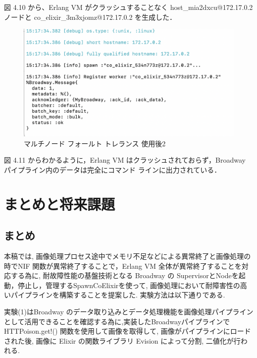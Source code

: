 \documentclass[a4paper]{jreport}	%
\begin{document}
図 4.10 から、Erlang VM がクラッシュすることなく host\_mia2dxcu@172.17.0.2 ノードと co\_elixir\_3m3xjomz@172.17.0.2 を生成した．

\begin{figure}[H]
\vspace{4cm}
\begin{center}
\hspace{-8cm}
\includegraphics[scale=0.5]{ja/f13.png}
\end{center}
\caption{マルチノード フォールト トレランス 使用後2}
\end{figure}

図 4.11 からわかるように，Erlang VM はクラッシュされておらず，Broadway パイプライン内のデータは完全にコマンド ラインに出力されている．




\chapter{まとめと将来課題}
\section{まとめ}
本稿では, 画像処理プロセス途中でメモリ不足などによる異常終了と画像処理の時でNIF 関数が異常終了することで，Erlang VM 全体が異常終了することを対応する為に, 耐故障性能の基盤技術となる Broadway の SupervisorとNodeを起動，停止し，管理するSpawnCoElixirを使って, 画像処理において耐障害性の高いパイプラインを構築することを提案した. 実験方法は以下通りである. 

実験(1)はBroadway のデータ取り込みとデータ処理機能を画像処理パイプラインとして活用できることを確認する為に,実装したBroadwayパイプラインで HTTPoison.get!() 関数を使用して画像を取得して, 画像がパイプラインにロードされた後, 画像に Elixir の関数ライブラリ Evision によって分割, 二値化が行われる. 
\end{document}
